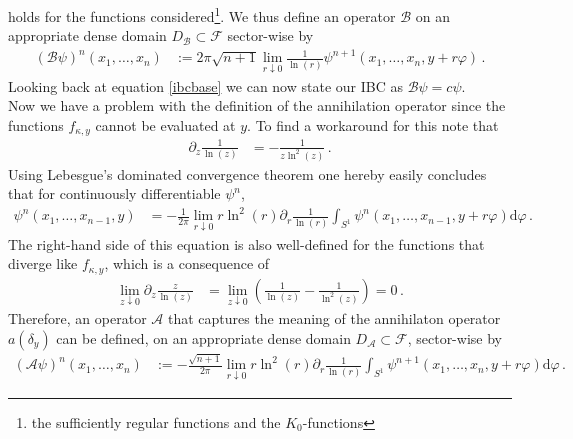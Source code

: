 holds for the functions considered\footnote{the sufficiently regular functions and the $K_{0}$-functions}. We thus define an operator $\mathcal{B}$ on an appropriate dense domain $D_{\mathcal{B}} \subset \mathcal {F}$ sector-wise by
\begin{align*}
  (\mathcal{B}\psi)^{n}
  \left(
    x_{1}
    ,
    \dots
    ,
    x_{n}
  \right)
  &:=
  2\pi
  \sqrt{n + 1}
  \lim_{r \downarrow 0}
  \frac{1}{\ln(r)}
  \psi^{n + 1}
  \left(
    x_{1}
    ,
    \dots
    ,
    x_{n}
    ,
    y
    +
    r\varphi
  \right)
  \,.
\end{align*}
Looking back at equation \eqref{ibcbase} we can now state our IBC as $\mathcal{B}\psi = c\psi$.
\\
Now we have a problem with the definition of the annihilation operator since the functions $f_{\kappa,y}$ cannot be evaluated at $y$. To find a workaround for this note that
\begin{align*}
  \partial_{z}
  \frac{1}{\ln(z)}
  &=
  -
  \frac{1}{z\ln^{2}(z)}
  \,.
\end{align*}
Using Lebesgue's dominated convergence theorem one hereby easily concludes that for continuously differentiable $\psi^{n}$,
\begin{align*}
  \psi^{n}
  \left(
    x_{1}
    ,
    \dots
    ,
    x_{n - 1}
    ,
    y
  \right)
  &=
  -
  \frac{1}{2\pi}
  \lim_{r \downarrow 0}
  r\ln^{2}(r)
  \partial_{r}
  \frac{1}{\ln(r)}
  \int_{S^{1}}
  \psi^{n}
  \left(
    x_{1}
    ,
    \dots
    ,
    x_{n - 1}
    ,
    y
    +
    r
    \varphi
  \right)
  \mathrm{d}\varphi
  \,.
\end{align*}
The right-hand side of this equation is also well-defined for the functions that diverge like $f_{\kappa,y}$, which is a consequence of
\begin{align*}
  \lim_{z \downarrow 0}
  \partial_{z}
  \frac{z}{\ln(z)}
  &=
  \lim_{z \downarrow 0}
  \left(
    \frac{1}{\ln(z)}
    -
    \frac{1}{\ln^{2}(z)}
  \right)
  =
  0
  \,.
\end{align*}
Therefore, an operator $\mathcal{A}$ that captures the meaning of the annihilaton operator $a(\delta_{y})$ can be defined, on an appropriate dense domain $D_{\mathcal{A}} \subset \mathcal{F}$, sector-wise by
\begin{align*}
  (\mathcal{A}\psi)^{n}
  \left(
    x_{1}
    ,
    \dots
    ,
    x_{n}
  \right)
  &:=
  -
  \frac{\sqrt{n + 1}}{2\pi}
  \lim_{r \downarrow 0}
  r\ln^{2}(r)
  \partial_{r}
  \frac{1}{\ln(r)}
  \int_{S^{1}}
  \psi^{n + 1}
  \left(
    x_{1}
    ,
    \dots
    ,
    x_{n}
    ,
    y
    +
    r\varphi
  \right)
  \mathrm{d}\varphi
  \,.
\end{align*}
